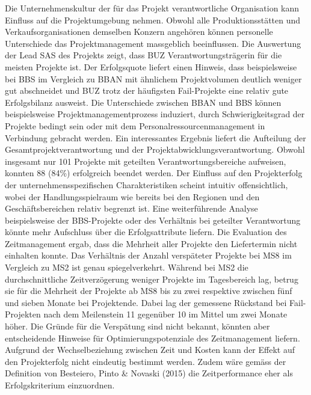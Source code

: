 \newline Die Unternehmenskultur der für das Projekt verantwortliche Organisation kann Einfluss auf die Projektumgebung nehmen. Obwohl alle Produktionsstätten und Verkaufsorganisationen demselben Konzern angehören können personelle Unterschiede das Projektmanagement massgeblich beeinflussen. Die Auswertung der Lead SAS des Projekts zeigt, dass BUZ Verantwortungsträgerin für die meisten Projekte ist. Der Erfolgsquote liefert einen Hinweis, dass beispielsweise bei BBS im Vergleich zu BBAN mit ähnlichem Projektvolumen deutlich weniger gut abschneidet und BUZ trotz der häufigsten Fail-Projekte eine relativ gute Erfolgsbilanz ausweist. Die Unterschiede zwischen BBAN und BBS können beispielsweise Projektmanagementprozess induziert, durch Schwierigkeitsgrad der Projekte bedingt sein oder mit dem Personalressourcenmanagement in Verbindung gebracht werden. Ein interessantes Ergebnis liefert die Aufteilung der Gesamtprojektverantwortung und der Projektabwicklungsverantwortung. Obwohl insgesamt nur 101 Projekte mit geteilten Verantwortungsbereiche aufweisen, konnten 88 (84\%) erfolgreich beendet werden. Der Einfluss auf den Projekterfolg der unternehmensspezifischen Charakteristiken scheint intuitiv offensichtlich, wobei der Handlungsspielraum wie bereits bei den Regionen und den Geschäftsbereichen relativ begrenzt ist. Eine weiterführende Analyse beispielsweise der BBS-Projekte oder des Verhältnis bei geteilter Verantwortung könnte mehr Aufschluss über die Erfolgsattribute liefern. 
\newline\newline
Die Evaluation des Zeitmanagement ergab, dass die Mehrheit aller Projekte den Liefertermin nicht einhalten konnte. Das Verhältnis der Anzahl verspäteter Projekte bei MS8 im Vergleich zu MS2 ist genau spiegelverkehrt. Während bei MS2 die durchschnittliche Zeitverzögerung weniger Projekte im Tagesbereich lag, betrug sie für die Mehrheit der Projekte ab MS8 bis zu zwei respektive zwischen fünf und sieben Monate bei Projektende. Dabei lag der gemessene Rückstand bei Fail-Projekten nach dem Meilenstein 11 gegenüber 10 im Mittel um zwei Monate höher. Die Gründe für die Verspätung sind nicht bekannt, könnten aber entscheidende Hinweise für Optimierungspotenziale des Zeitmanagement liefern. Aufgrund der Wechselbeziehung zwischen Zeit und Kosten kann der Effekt auf den Projekterfolg nicht eindeutig bestimmt werden. Zudem wäre gemäss der Definition von Besteiero, Pinto \& Novaski (2015) die Zeitperformance eher als Erfolgskriterium einzuordnen. 
\newline\newline
